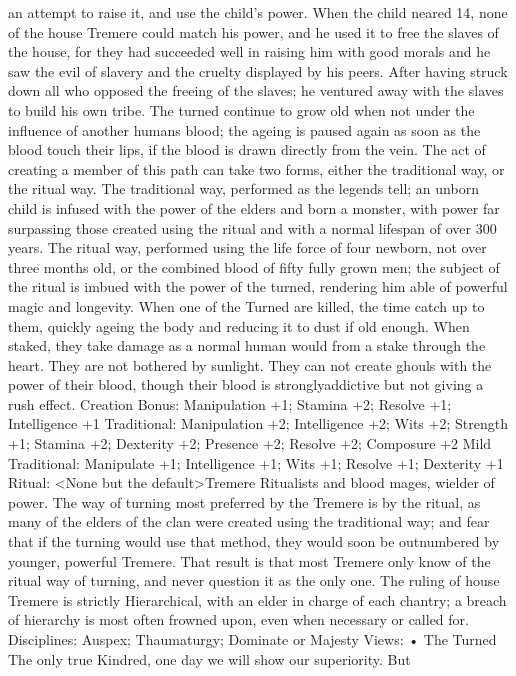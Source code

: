 \documentclass[10pt,a4paper]{article}
\begin{document}
an attempt to raise it, and use the child's power. When the child neared 14,
none of the house Tremere could match his power, and he used it to free the
slaves of the house, for they had succeeded well in raising him with good
morals and he saw the evil of slavery and the cruelty displayed by his peers.
After having struck down all who opposed the freeing of the slaves; he
ventured away with the slaves to build his own tribe.
The turned continue to grow old when not under the influence of another
humans blood; the ageing is paused again as soon as the blood touch their
lips, if the blood is drawn directly from the vein.
The act of creating a member of this path can take two forms, either the
traditional way, or the ritual way.
The traditional way, performed as the legends tell; an unborn child is
infused with the power of the elders and born a monster, with power far
surpassing those created using the ritual and with a normal lifespan of over
300 years.
The ritual way, performed using the life force of four newborn, not over
three months old, or the combined blood of fifty fully grown men; the
subject of the ritual is imbued with the power of the turned, rendering him
able of powerful magic and longevity.
When one of the Turned are killed, the time catch up to them, quickly
ageing the body and reducing it to dust if old enough.
When staked, they take damage as a normal human would from a stake
through the heart. They are not bothered by sunlight. They can not create
ghouls with the power of their blood, though their blood is stronglyaddictive but not giving a rush effect.
Creation Bonus:
Manipulation +1; Stamina +2; Resolve +1; Intelligence +1
Traditional:
Manipulation +2; Intelligence +2; Wits +2; Strength +1; Stamina +2;
Dexterity +2; Presence +2; Resolve +2; Composure +2
Mild Traditional:
Manipulate +1; Intelligence +1; Wits +1; Resolve +1; Dexterity +1
Ritual:
<None but the default>Tremere
Ritualists and blood mages, wielder of power.
The way of turning most preferred by the Tremere is by the ritual, as many
of the elders of the clan were created using the traditional way; and fear that
if the turning would use that method, they would soon be outnumbered by
younger, powerful Tremere. That result is that most Tremere only know of
the ritual way of turning, and never question it as the only one.
The ruling of house Tremere is strictly Hierarchical, with an elder in charge
of each chantry; a breach of hierarchy is most often frowned upon, even
when necessary or called for.
Disciplines: Auspex; Thaumaturgy; Dominate or Majesty
Views:
• The Turned
The only true Kindred, one day we will show our superiority. But
\end{document}

